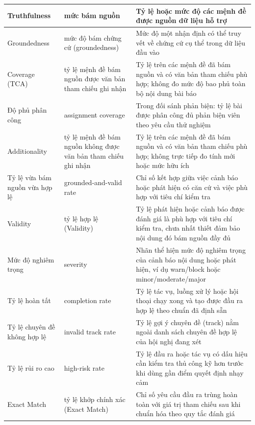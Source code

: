 \begin{longtable}{|C{0.16\textwidth}|P{0.22\textwidth}|P{0.55\textwidth}|}
  Truthfulness     &     mức bám nguồn     &     Tỷ lệ hoặc mức độ các mệnh đề được nguồn dữ liệu hỗ trợ \\ \hline
  Groundedness      &      mức độ bám chứng cứ (groundedness)      &      Mức độ một nhận định có thể truy vết về chứng cứ cụ thể trong dữ liệu đầu vào \\ \hline
  Coverage (TCA)     &     tỷ lệ mệnh đề bám nguồn được văn bản tham chiếu ghi nhận     &     Tỷ lệ trên các mệnh đề đã bám nguồn và có văn bản tham chiếu phù hợp; không đo mức độ bao phủ toàn bộ nội dung bài báo \\ \hline
  Độ phủ phân công      &      assignment coverage      &      Trong đối sánh phản biện: tỷ lệ bài được phân công đủ phản biện viên theo yêu cầu thử nghiệm \\ \hline
  Additionality      &      tỷ lệ mệnh đề bám nguồn không được văn bản tham chiếu ghi nhận      &      Tỷ lệ trên các mệnh đề đã bám nguồn và có văn bản tham chiếu phù hợp; không trực tiếp đo tính mới hoặc mức hữu ích \\ \hline
  Tỷ lệ vừa bám nguồn vừa hợp lệ     &     grounded-\allowbreak and-\allowbreak valid rate     &     Chỉ số kết hợp giữa việc cảnh báo hoặc phát hiện có căn cứ và việc phù hợp với tiêu chí kiểm tra \\ \hline
  Validity     &     tỷ lệ hợp lệ (Validity)     &     Tỷ lệ phát hiện hoặc cảnh báo được đánh giá là phù hợp với tiêu chí kiểm tra, chưa nhất thiết đảm bảo nội dung đó bám nguồn đầy đủ \\ \hline
  Mức độ nghiêm trọng     &     severity     &     Nhãn thể hiện mức độ nghiêm trọng của cảnh báo nội dung hoặc phát hiện, ví dụ warn/block hoặc minor/moderate/major \\ \hline
  Tỷ lệ hoàn tất     &     completion rate     &     Tỷ lệ tác vụ, luồng xử lý hoặc hội thoại chạy xong và tạo được đầu ra hợp lệ theo chuẩn đã định sẵn \\ \hline
  Tỷ lệ chuyên đề không hợp lệ      &      invalid track rate      &      Tỷ lệ gợi ý chuyên đề (track) nằm ngoài danh sách chuyên đề hợp lệ của hội nghị đang xét \\ \hline
  Tỷ lệ rủi ro cao     &     high-\allowbreak risk rate     &     Tỷ lệ đầu ra hoặc tác vụ có dấu hiệu cần kiểm tra thủ công kỹ hơn trước khi dùng gần điểm quyết định nhạy cảm \\ \hline
  Exact Match      &      tỷ lệ khớp chính xác (Exact Match)      &      Chỉ số yêu cầu đầu ra trùng hoàn toàn với giá trị tham chiếu sau khi chuẩn hóa theo quy tắc đánh giá \\ \hline

\end{longtable}

